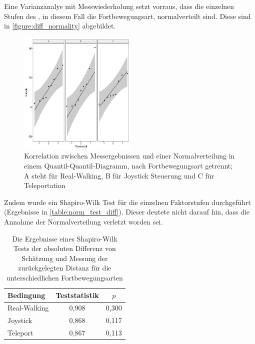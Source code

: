                     Eine Varianzanalye mit Messwiederholung setzt vorraus, dass die einzelnen Stufen des , in diesem Fall die Fortbewegungsart, normalverteilt sind. Diese sind in \autoref{figure:diff_normality} abgebildet.

                    \begin{figure}[!h]
                        \centering
                        \includegraphics[width=0.5\textwidth]{plots/diff_normality.png}
                        \caption{Korrelation zwischen Messergebnissen und einer Normalverteilung in einem Quantil-Quantil-Diagramm, nach Fortbewegungsart getrennt; A steht für Real-Walking, B für Joystick Steuerung und C für Teleportation}\label{figure:diff_normality}
                    \end{figure}

                    Zudem wurde ein Shapiro-Wilk Test für die einzelnen Faktorstufen durchgeführt (Ergebnisse in \autoref{table:norm_test_diff}). Dieser deutete nicht darauf hin, dass die Annahme der Normalverteilung verletzt worden sei.

                    \begin{table}[!h]
                        \renewcommand\arraystretch{1.2}
                        \centering
                        \begin{tabular}{lcc} \toprule
                            Bedingung    & Teststatistik    & $p$   \\ \midrule
                            Real-Walking & 0,908            & 0,300 \\
                            Joystick     & 0,868            & 0,117 \\
                            Teleport     & 0,867            & 0,113 \\ \bottomrule
                        \end{tabular}
                        \caption{Die Ergebnisse eines Shapiro-Wilk Tests der absoluten Differenz von Schätzung und Messung der zurückgelegten Distanz für die unterschiedlichen Fortbewegungsarten}\label{table:norm_test_diff}
                    \end{table}

